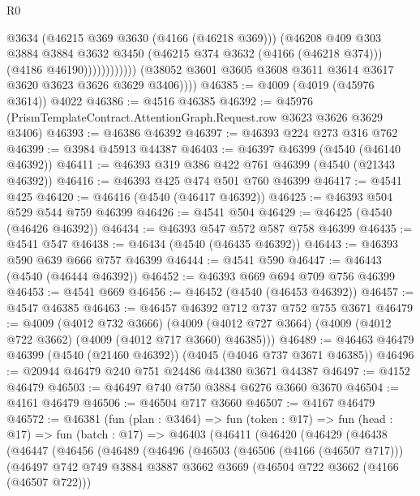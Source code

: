 \begin{lexlean}{R0}
\begin{coremodule}
                              @3634
                              (@46215 @369 @3630 (@4166 (@46218 @369)))
                              (@46208
                                @409
                                @303
                                @3884
                                @3884
                                @3632
                                @3450
                                (@46215 @374 @3632 (@4166 (@46218 @374)))
                                (@4186 @46190))))))))))))
          (@38052 @3601 @3605 @3608 @3611 @3614 @3617 @3620 @3623 @3626 @3629 @3406))))
@46385 := @4009 (@4019 (@45976 @3614)) @4022
@46386 := @4516 @46385
@46392 := @45976 (PrismTemplateContract.AttentionGraph.Request.row @3623 @3626 @3629 @3406)
@46393 := @46386 @46392
@46397 := @46393 @224 @273 @316 @762
@46399 := @3984 @45913 @44387
@46403 := @46397 @46399 (@4540 (@46140 @46392))
@46411 := @46393 @319 @386 @422 @761 @46399 (@4540 (@21343 @46392))
@46416 := @46393 @425 @474 @501 @760 @46399
@46417 := @4541 @425
@46420 := @46416 (@4540 (@46417 @46392))
@46425 := @46393 @504 @529 @544 @759 @46399
@46426 := @4541 @504
@46429 := @46425 (@4540 (@46426 @46392))
@46434 := @46393 @547 @572 @587 @758 @46399
@46435 := @4541 @547
@46438 := @46434 (@4540 (@46435 @46392))
@46443 := @46393 @590 @639 @666 @757 @46399
@46444 := @4541 @590
@46447 := @46443 (@4540 (@46444 @46392))
@46452 := @46393 @669 @694 @709 @756 @46399
@46453 := @4541 @669
@46456 := @46452 (@4540 (@46453 @46392))
@46457 := @4547 @46385
@46463 := @46457 @46392 @712 @737 @752 @755 @3671
@46479 := @4009
    (@4012 @732 @3666)
    (@4009 (@4012 @727 @3664) (@4009 (@4012 @722 @3662) (@4009 (@4012 @717 @3660) @46385)))
@46489 := @46463 @46479 @46399 (@4540 (@21460 @46392)) (@4045 (@4046 @737 @3671 @46385))
@46496 := @20944 @46479 @240 @751 @24486 @44380 @3671 @44387
@46497 := @4152 @46479
@46503 := @46497 @740 @750 @3884 @6276 @3660 @3670
@46504 := @4161 @46479
@46506 := @46504 @717 @3660
@46507 := @4167 @46479
@46572 := @46381
    (fun (plan : @3464) =>
    fun (token : @17) =>
    fun (head : @17) =>
    fun (batch : @17) =>
    @46403
      (@46411
        (@46420
          (@46429
            (@46438
              (@46447
                (@46456
                  (@46489
                    (@46496
                      (@46503
                        (@46506 (@4166 (@46507 @717)))
                        (@46497
                          @742
                          @749
                          @3884
                          @3887
                          @3662
                          @3669
                          (@46504 @722 @3662 (@4166 (@46507 @722)))

\end{coremodule}
\end{lexlean}

